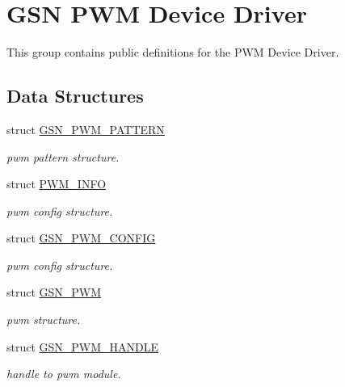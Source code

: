 \hypertarget{a00650}{
\section{GSN PWM Device Driver}
\label{a00650}
}


This group contains public definitions for the PWM Device Driver.  


\subsection*{Data Structures}
\begin{DoxyCompactItemize}
\item 
struct \hyperlink{a00183}{GSN\_\-PWM\_\-PATTERN}
\begin{DoxyCompactList}\small\item\em pwm pattern structure. \end{DoxyCompactList}\item 
struct \hyperlink{a00454}{PWM\_\-INFO}
\begin{DoxyCompactList}\small\item\em pwm config structure. \end{DoxyCompactList}\item 
struct \hyperlink{a00181}{GSN\_\-PWM\_\-CONFIG}
\begin{DoxyCompactList}\small\item\em pwm config structure. \end{DoxyCompactList}\item 
struct \hyperlink{a00180}{GSN\_\-PWM}
\begin{DoxyCompactList}\small\item\em pwm structure. \end{DoxyCompactList}\item 
struct \hyperlink{a00182}{GSN\_\-PWM\_\-HANDLE}
\begin{DoxyCompactList}\small\item\em handle to pwm module. \end{DoxyCompactList}\end{DoxyCompactItemize}
